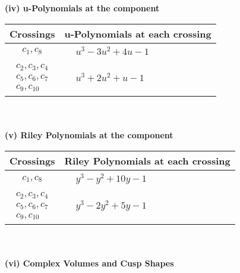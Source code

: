 \documentclass[1p]{elsarticle_modified}
\theoremstyle{definition}
\begin{document}
\newpage\renewcommand{\arraystretch}{1}
\flushleft \textbf{(iv) u-Polynomials at the component}\newline \\
\begin{tabular}{m{50pt}|m{274pt}}
Crossings & \hspace{64pt}u-Polynomials at each crossing \\
\hline $$\begin{aligned}c_{1},c_{8}\end{aligned}$$&$\begin{aligned}
&u^3-3 u^2+4 u-1
\end{aligned}$\\
\hline $$\begin{aligned}c_{2},c_{3},c_{4}\\c_{5},c_{6},c_{7}\\c_{9},c_{10}\end{aligned}$$&$\begin{aligned}
&u^3+2 u^2+u-1
\end{aligned}$\\
\hline
\end{tabular}\\~\\
\newpage\renewcommand{\arraystretch}{1}
\flushleft \textbf{(v) Riley Polynomials at the component}\newline \\
\begin{tabular}{m{50pt}|m{274pt}}
Crossings & \hspace{64pt}Riley Polynomials at each crossing \\
\hline $$\begin{aligned}c_{1},c_{8}\end{aligned}$$&$\begin{aligned}
&y^3- y^2+10 y-1
\end{aligned}$\\
\hline $$\begin{aligned}c_{2},c_{3},c_{4}\\c_{5},c_{6},c_{7}\\c_{9},c_{10}\end{aligned}$$&$\begin{aligned}
&y^3-2 y^2+5 y-1
\end{aligned}$\\
\hline
\end{tabular}\\~\\
\newpage\flushleft \textbf{(vi) Complex Volumes and Cusp Shapes}
\end{document}
